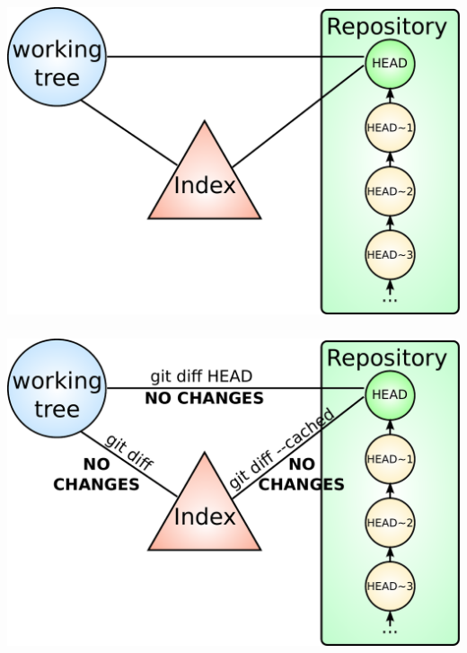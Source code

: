 \begin{frame}
  \frametitle{\insertsubsection}
  \begin{center}
    \includegraphics[width=1.0\textwidth]{images/pdf/git-detailed-7.pdf}
  \end{center}
\end{frame}
\begin{frame}
  \frametitle{\insertsubsection}
  \begin{center}
    \includegraphics[width=1.0\textwidth]{images/pdf/git-detailed-8.pdf}
  \end{center}
\end{frame}
